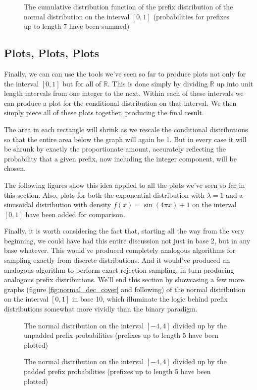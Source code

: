 \begin{figure}[h!]
    \centering
    
    \caption{The cumulative distribution function of the prefix distribution of the normal distribution on the interval $[0,1]$ (probabilities for prefixes up to length 7 have been summed)}
    \label{fig:normal_bin_cdf}
\end{figure}

\subsection{Plots, Plots, Plots}

Finally, we can can use the tools we've seen so far to produce plots not only for the interval $[0,1]$ but for all of $\mathbb{R}$. This is done simply by dividing $\mathbb{R}$ up into unit length intervals from one integer to the next. Within each of these intervals we can produce a plot for the conditional distribution on that interval. We then simply piece all of these plots together, producing the final result.

The area in each rectangle will shrink as we rescale the conditional distributions so that the entire area below the graph will again be 1. But in every case it will be shrunk by exactly the proportionate amount, accurately reflecting the probability that a given prefix, now including the integer component, will be chosen.

The following figures show this idea applied to all the plots we've seen so far in this section. Also, plots for both the exponential distribution with $\lambda = 1$ and a sinusoidal distribution with density $f(x) = \sin(4\pi x) + 1$ on the interval $[0,1]$ have been added for comparison.

Finally, it is worth considering the fact that, starting all the way from the very beginning, we could have had this entire discussion not just in base 2, but in any base whatever. This would've produced completely analogous algorithms for sampling exactly from discrete distributions. And it would've produced an analogous algorithm to perform exact rejection sampling, in turn producing analogous prefix distributions. We'll end this section by showcasing a few more graphs (figure \ref{fig:normal_dec_cover} and following) of the normal distribution on the interval $[0,1]$ in base 10, which illuminate the logic behind prefix distributions somewhat more vividly than the binary paradigm.

\begin{figure}
    \centering
    
    \caption{The normal distribution on the interval $[-4,4]$ divided up by the unpadded prefix probabilities (prefixes up to length 5 have been plotted)}
    \label{fig:normal_bin_cover_full}\vspace{2em}
    
    
    \caption{The normal distribution on the interval $[-4,4]$ divided up by the padded prefix probabilities (prefixes up to length 5 have been plotted)}
    \label{fig:normal_bin_cover_full}
\end{figure}

